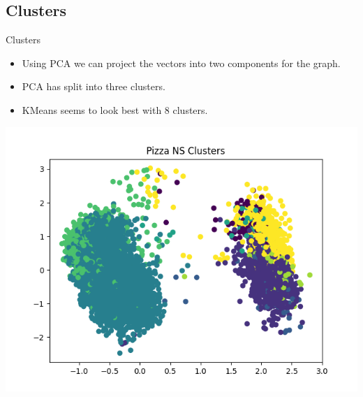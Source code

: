 \documentclass{beamer}
\begin{document}
\subsection{Clusters}
\begin{frame}{Clusters}
	\begin{itemize}
		\item Using PCA we can project the vectors into two components for the graph.
		\item PCA has split into three clusters.
		\item KMeans seems to look best with 8 clusters.
	\end{itemize}
	\center\includegraphics[scale=0.4]{pizzaDataModelClusters}
\end{frame}
\end{document}
